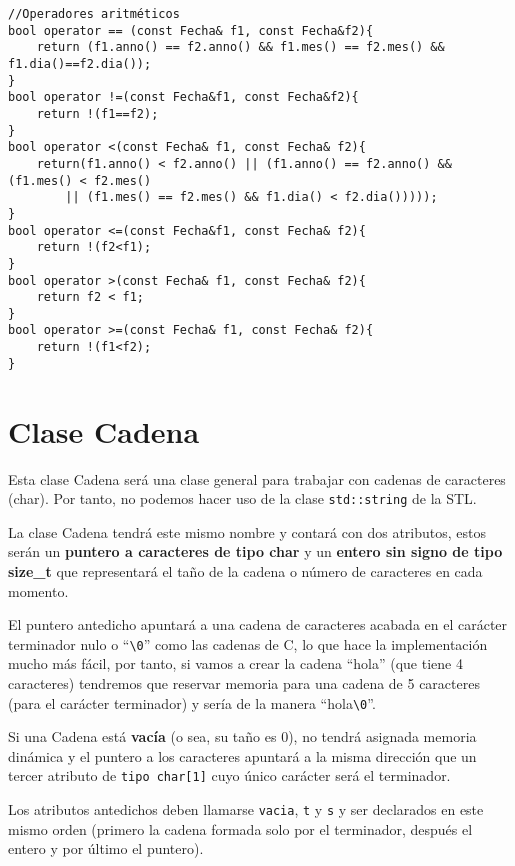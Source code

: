 \begin{verbatim}
//Operadores aritméticos
bool operator == (const Fecha& f1, const Fecha&f2){
    return (f1.anno() == f2.anno() && f1.mes() == f2.mes() && f1.dia()==f2.dia());
}
bool operator !=(const Fecha&f1, const Fecha&f2){
    return !(f1==f2);
}
bool operator <(const Fecha& f1, const Fecha& f2){
    return(f1.anno() < f2.anno() || (f1.anno() == f2.anno() && (f1.mes() < f2.mes()
        || (f1.mes() == f2.mes() && f1.dia() < f2.dia()))));
}
bool operator <=(const Fecha&f1, const Fecha& f2){
    return !(f2<f1);
}
bool operator >(const Fecha& f1, const Fecha& f2){
    return f2 < f1;
}
bool operator >=(const Fecha& f1, const Fecha& f2){
    return !(f1<f2);
}

\end{verbatim}

\section {Clase Cadena}
Esta clase Cadena será una clase general para trabajar con cadenas de caracteres (char). Por tanto,
no podemos hacer uso de la clase \texttt{std::string} de la STL.

La clase Cadena tendrá este mismo nombre y contará con dos atributos, estos serán un \textbf{puntero a 
caracteres de tipo char} y un \textbf{entero sin signo de tipo size\_t} que representará el taño
de la cadena o número de caracteres en cada momento. 

El puntero antedicho apuntará a una cadena de caracteres acabada en el carácter terminador nulo 
o ``\verb|\0|'' como las cadenas de C, lo que hace la implementación mucho más fácil, por tanto,
si vamos a crear la cadena ``hola'' (que tiene 4 caracteres) tendremos que reservar memoria para
una cadena de 5 caracteres (para el carácter terminador) y sería de la manera ``hola\verb|\0|''.

Si una Cadena está \textbf{vacía} (o sea, su taño es 0), no tendrá asignada memoria dinámica y el 
puntero a los caracteres apuntará a la misma dirección que un tercer atributo de \texttt{tipo char[1]} 
cuyo único carácter será el terminador.

Los atributos antedichos deben llamarse \texttt{vacia}, \texttt{t} y \texttt{s} y ser declarados en este mismo orden 
(primero la cadena formada solo por el terminador, después el entero y por último el puntero).


